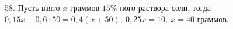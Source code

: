 58. Пусть взято $x$ граммов $15\%$-ного раствора соли, тогда $0,15x+0,6\cdot50=0,4(x+50),\ 0,25x=10,\ x=40$ граммов.\\
